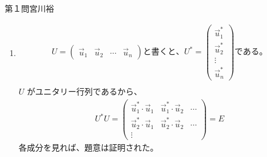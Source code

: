 \documentclass[fleqn]{jbook}
\begin{document}
\begin{answer}{第１問}{宮川裕}
\begin{enumerate}
\item
  \begin{eqnarray*}
  U=\begin{pmatrix} \vec{u}_1 & \vec{u}_2 & \cdots & \vec{u}_n\end{pmatrix}と書くと、
  U^{*}= \begin{pmatrix} \vec{u}_1^* \\ \vec{u}_2^* \\ \vdots \\ \vec{u}_n^* \end{pmatrix}である。\\
  \end{eqnarray*}
  $U$ がユニタリー行列であるから、
  \begin{eqnarray*}
  U^{*}U=\begin{pmatrix} \vec{u}_1^* \cdot \vec{u}_1 &
                          \vec{u}_1^* \cdot \vec{u}_2 & \cdots \\
                          \vec{u}_2^* \cdot \vec{u}_1 &
                          \vec{u}_2^* \cdot \vec{u}_2 & \cdots \\
                          \vdots \end{pmatrix}=E
  \end{eqnarray*}
  各成分を見れば、題意は証明された。


\end{enumerate}
\end{answer}
\end{document}
